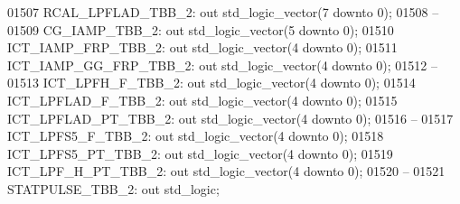 \begin{DoxyCode}
01507         RCAL\_LPFLAD\_TBB\_2:  \textcolor{keywordflow}{out} \textcolor{comment}{std\_logic\_vector}(\textcolor{vhdllogic}{}\textcolor{vhdllogic}{7} \textcolor{keywordflow}{downto} \textcolor{vhdllogic}{}\textcolor{vhdllogic}{0});
01508 \textcolor{keyword}{        --}
01509         CG\_IAMP\_TBB\_2:  \textcolor{keywordflow}{out} \textcolor{comment}{std\_logic\_vector}(\textcolor{vhdllogic}{}\textcolor{vhdllogic}{5} \textcolor{keywordflow}{downto} \textcolor{vhdllogic}{}\textcolor{vhdllogic}{0});
01510         ICT\_IAMP\_FRP\_TBB\_2: \textcolor{keywordflow}{out} \textcolor{comment}{std\_logic\_vector}(\textcolor{vhdllogic}{}\textcolor{vhdllogic}{4} \textcolor{keywordflow}{downto} \textcolor{vhdllogic}{}\textcolor{vhdllogic}{0});
01511         ICT\_IAMP\_GG\_FRP\_TBB\_2:  \textcolor{keywordflow}{out} \textcolor{comment}{std\_logic\_vector}(\textcolor{vhdllogic}{}\textcolor{vhdllogic}{4} \textcolor{keywordflow}{downto} \textcolor{vhdllogic}{}\textcolor{vhdllogic}{0});
01512 \textcolor{keyword}{        --}
01513         ICT\_LPFH\_F\_TBB\_2:   \textcolor{keywordflow}{out} \textcolor{comment}{std\_logic\_vector}(\textcolor{vhdllogic}{}\textcolor{vhdllogic}{4} \textcolor{keywordflow}{downto} \textcolor{vhdllogic}{}\textcolor{vhdllogic}{0});
01514         ICT\_LPFLAD\_F\_TBB\_2: \textcolor{keywordflow}{out} \textcolor{comment}{std\_logic\_vector}(\textcolor{vhdllogic}{}\textcolor{vhdllogic}{4} \textcolor{keywordflow}{downto} \textcolor{vhdllogic}{}\textcolor{vhdllogic}{0});
01515         ICT\_LPFLAD\_PT\_TBB\_2:    \textcolor{keywordflow}{out} \textcolor{comment}{std\_logic\_vector}(\textcolor{vhdllogic}{}\textcolor{vhdllogic}{4} \textcolor{keywordflow}{downto} \textcolor{vhdllogic}{}\textcolor{vhdllogic}{0});
01516 \textcolor{keyword}{        --}
01517         ICT\_LPFS5\_F\_TBB\_2:  \textcolor{keywordflow}{out} \textcolor{comment}{std\_logic\_vector}(\textcolor{vhdllogic}{}\textcolor{vhdllogic}{4} \textcolor{keywordflow}{downto} \textcolor{vhdllogic}{}\textcolor{vhdllogic}{0});
01518         ICT\_LPFS5\_PT\_TBB\_2: \textcolor{keywordflow}{out} \textcolor{comment}{std\_logic\_vector}(\textcolor{vhdllogic}{}\textcolor{vhdllogic}{4} \textcolor{keywordflow}{downto} \textcolor{vhdllogic}{}\textcolor{vhdllogic}{0});
01519         ICT\_LPF\_H\_PT\_TBB\_2: \textcolor{keywordflow}{out} \textcolor{comment}{std\_logic\_vector}(\textcolor{vhdllogic}{}\textcolor{vhdllogic}{4} \textcolor{keywordflow}{downto} \textcolor{vhdllogic}{}\textcolor{vhdllogic}{0});
01520 \textcolor{keyword}{        --}
01521         STATPULSE\_TBB\_2:    \textcolor{keywordflow}{out} \textcolor{comment}{std\_logic};

\end{DoxyCode}

